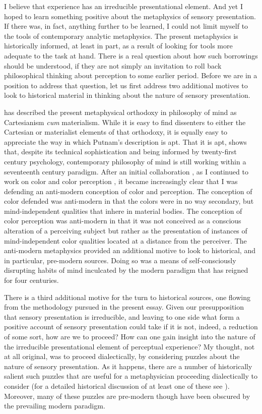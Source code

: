 I believe that experience has an irreducible presentational element. And yet I hoped to learn something positive about the metaphysics of sensory presentation. If there was, in fact, anything further to be learned, I could not limit myself to the tools of contemporary analytic metaphysics. The present metaphysics is historically informed, at least in part, as a result of looking for tools more adequate to the task at hand. There is a real question about how such borrowings should be understood, if they are not simply an invitation to roll back philosophical thinking about perception to some earlier period. Before we are in a position to address that question, let us first address two additional motives to look to historical material in thinking about the nature of sensory presentation.

\citet{Putnam:1993kx,Putnam:1994kx,Putnam:1999eu} has described the present metaphysical orthodoxy in philosophy of mind as Cartesianism \emph{cum} materialism. While it is easy to find dissenters to either the Cartesian or materialist elements of that orthodoxy, it is equally easy to appreciate the way in which Putnam's description is apt. That it is apt, shows that, despite its technical sophistication and being informed by twenty-first century psychology, contemporary philosophy of mind is still working within a seventeenth century paradigm. After an initial collaboration \citep{Hilbert:2000on}, as I continued to work on color and color perception \citep{Kalderon:2006tg,Kalderon:2008fk,Kalderon:2007mr,Kalderon:2010fj,Kalderon:2011fk}, it became increasingly clear that I was defending an anti-modern conception of color and perception. The conception of color defended was anti-modern in that the colors were in no way secondary, but mind-independent qualities that inhere in material bodies. The conception of color perception was anti-modern in that it was not conceived as a conscious alteration of a perceiving subject but rather as the presentation of instances of mind-independent color qualities located at a distance from the perceiver. The anti-modern metaphysics provided an additional motive to look to historical, and in particular, pre-modern sources. Doing so was a means of self-consciously disrupting habits of mind inculcated by the modern paradigm that has reigned for four centuries. 

There is a third additional motive for the turn to historical sources, one flowing from the methodology pursued in the present essay. Given our presupposition that sensory presentation is irreducible, and leaving to one side what form a positive account of sensory presentation could take if it is not, indeed, a reduction of some sort, how are we to proceed? How can one gain insight into the nature of the irreducible presentational element of perceptual experience? My thought, not at all original, was to proceed dialectically, by considering puzzles about the nature of sensory presentation. As it happens, there are a number of historically salient such puzzles that are useful for a metaphysician proceeding dialectically to consider (for a detailed historical discussion of at least one of these see \citealt{Kalderon:2015fr}). Moreover, many of these puzzles are pre-modern though have been obscured by the prevailing modern paradigm.

